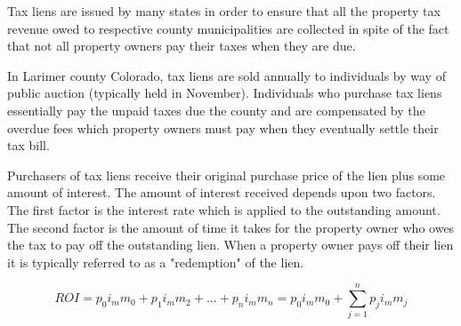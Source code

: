 \documentclass[11pt]{article}
\begin{document}
Tax liens are issued by many states in order to ensure that all the property tax revenue owed to respective county municipalities are collected in spite of the fact that not all property owners pay their taxes when they are due.

In Larimer county Colorado, tax liens are sold annually to individuals by way of public auction (typically held in November).  Individuals who purchase tax liens essentially pay the unpaid taxes due the county and are compensated by the overdue fees which property owners must pay when they eventually settle their tax bill.

Purchasers of tax liens receive their original purchase price of the lien plus some amount of interest.  The amount of interest received depends upon two factors. The first factor is the interest rate which is applied to the outstanding amount.  The second factor is the amount of time it takes for the property owner who owes the tax to pay off the outstanding lien.  When a property owner pays off their lien it is typically referred to as a "redemption" of the lien.

\begin{equation}
ROI = p_0i_mm_0 + p_1i_mm_2 + ... + p_ni_mm_n = p_0i_mm_0 + \sum_{j=1}^np_ji_mm_j
\end{equation}
\end{document}
